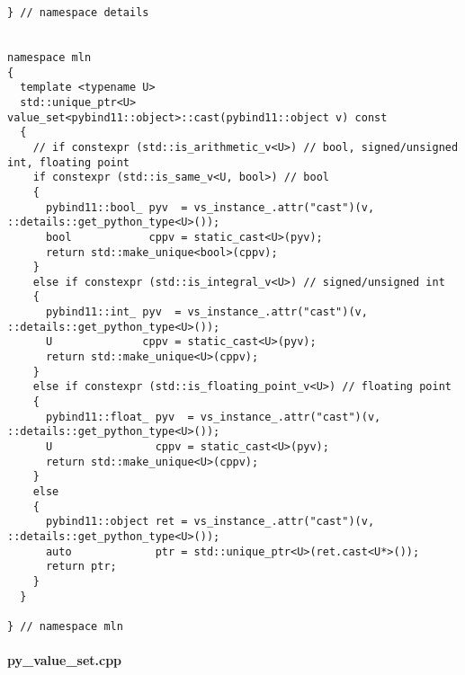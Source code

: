 \begin{verbatim}
} // namespace details


namespace mln
{
  template <typename U>
  std::unique_ptr<U> value_set<pybind11::object>::cast(pybind11::object v) const
  {
    // if constexpr (std::is_arithmetic_v<U>) // bool, signed/unsigned int, floating point
    if constexpr (std::is_same_v<U, bool>) // bool
    {
      pybind11::bool_ pyv  = vs_instance_.attr("cast")(v, ::details::get_python_type<U>());
      bool            cppv = static_cast<U>(pyv);
      return std::make_unique<bool>(cppv);
    }
    else if constexpr (std::is_integral_v<U>) // signed/unsigned int
    {
      pybind11::int_ pyv  = vs_instance_.attr("cast")(v, ::details::get_python_type<U>());
      U              cppv = static_cast<U>(pyv);
      return std::make_unique<U>(cppv);
    }
    else if constexpr (std::is_floating_point_v<U>) // floating point
    {
      pybind11::float_ pyv  = vs_instance_.attr("cast")(v, ::details::get_python_type<U>());
      U                cppv = static_cast<U>(pyv);
      return std::make_unique<U>(cppv);
    }
    else
    {
      pybind11::object ret = vs_instance_.attr("cast")(v, ::details::get_python_type<U>());
      auto             ptr = std::unique_ptr<U>(ret.cast<U*>());
      return ptr;
    }
  }

} // namespace mln
\end{verbatim}

\paragraph{py\_value\_set.cpp}

